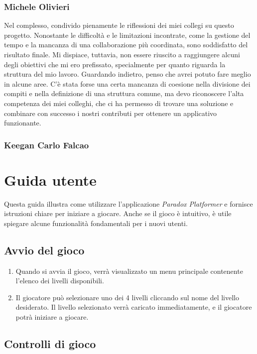 \documentclass[a4paper,12pt]{report}
\begin{document}
\subsection{Michele Olivieri}
Nel complesso, condivido pienamente le riflessioni dei miei collegi su questo progetto. Nonostante le difficoltà e le limitazioni incontrate, come la gestione del tempo e la mancanza di una collaborazione più coordinata, sono soddisfatto del risultato finale. Mi dispiace, tuttavia, non essere riuscito a raggiungere alcuni degli obiettivi che mi ero prefissato, specialmente per quanto riguarda la struttura del mio lavoro. Guardando indietro, penso che avrei potuto fare meglio in alcune aree. C'è stata forse una certa mancanza di coesione nella divisione dei compiti e nella definizione di una struttura comune, ma devo riconoscere l'alta competenza dei miei colleghi, che ci ha permesso di trovare una soluzione e combinare con successo i nostri contributi per ottenere un applicativo funzionante.
\subsection{Keegan Carlo Falcao}
	
	\appendix
	\chapter{Guida utente}
	
	Questa guida illustra come utilizzare l’applicazione \textit{Paradox Platformer} e fornisce istruzioni chiare per iniziare a giocare. Anche se il gioco è intuitivo, è utile spiegare alcune funzionalità fondamentali per i nuovi utenti.
	
	\section{Avvio del gioco}
	
	\begin{enumerate}
		\item Quando si avvia il gioco, verrà visualizzato un menu principale contenente l’elenco dei livelli disponibili.
		\item Il giocatore può selezionare uno dei 4 livelli cliccando sul nome del livello desiderato. Il livello selezionato verrà caricato immediatamente, e il giocatore potrà iniziare a giocare.
	\end{enumerate}
	
	\section{Controlli di gioco}
	
\end{document}
